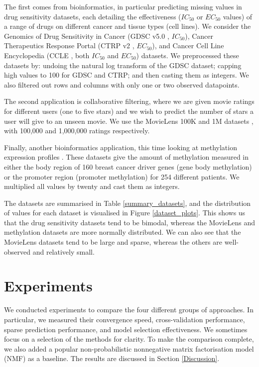 \documentclass[letterpaper]{article} %
\begin{document}
	The first comes from bioinformatics, in particular predicting missing values in drug sensitivity datasets, each detailing the effectiveness ($IC_{50}$ or $EC_{50}$ values) of a range of drugs on different cancer and tissue types (cell lines). We consider the Genomics of Drug Sensitivity in Cancer (GDSC v5.0 \cite{Yang2013}, $IC_{50}$), Cancer Therapeutics Response Portal (CTRP v2 \cite{Seashore-Ludlow2015}, $EC_{50}$), and Cancer Cell Line Encyclopedia (CCLE \cite{Barretina2012}, both $IC_{50}$ and $EC_{50}$) datasets. 
	We preprocessed these datasets by: undoing the natural log transform of the GDSC dataset; capping high values to 100 for GDSC and CTRP; and then casting them as integers. We also filtered out rows and columns with only one or two observed datapoints. 
	
	The second application is collaborative filtering, where we are given movie ratings for different users (one to five stars) and we wish to predict the number of stars a user will give to an unseen movie. We use the MovieLens 100K and 1M datasets \cite{Harper2015}, with 100,000 and 1,000,000 ratings respectively.
	
	Finally, another bioinformatics application, this time looking at methylation expression profiles \cite{Koboldt2012}. These datasets give the amount of methylation measured in either the body region of 160 breast cancer driver genes (gene body methylation) or the promoter region (promoter methylation) for 254 different patients. We multiplied all values by twenty and cast them as integers. 
	
	The datasets are summarised in Table \ref{summary_datasets}, and the distribution of values for each dataset is visualised in Figure \ref{dataset_plots}. This shows us that the drug sensitivity datasets tend to be bimodal, whereas the MovieLens and methylation datasets are more normally distributed. We can also see that the MovieLens datasets tend to be large and sparse, whereas the others are well-observed and relatively small.
	
	

\section{Experiments} \label{Experiments}
	We conducted experiments to compare the four different groups of approaches. In particular, we measured their convergence speed, cross-validation performance, sparse prediction performance, and model selection effectiveness. We sometimes focus on a selection of the methods for clarity. To make the comparison complete, we also added a popular non-probabilistic nonnegative matrix factorisation model (NMF) \cite{Lee2000} as a baseline.
	The results are discussed in Section \ref{Discussion}.
\end{document}
